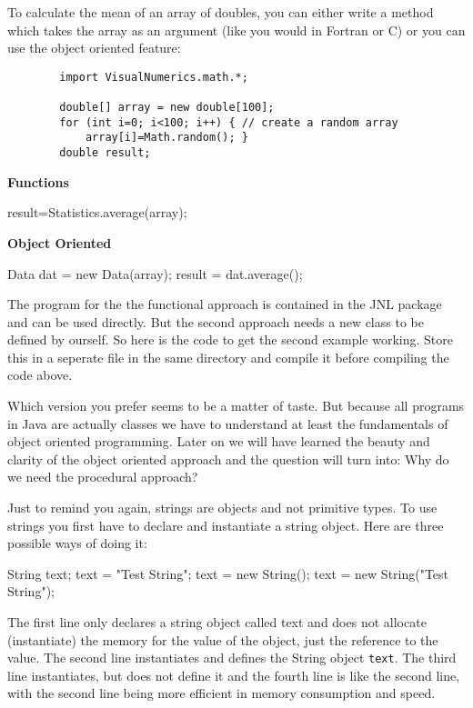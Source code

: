 To calculate the mean of an array of doubles, you can
either write a method which takes the array as an argument (like you would
in Fortran or C) or you can use the object
oriented feature:
\begin{small}
\begin{verbatim}
        import VisualNumerics.math.*;

        double[] array = new double[100]; 
        for (int i=0; i<100; i++) { // create a random array
            array[i]=Math.random(); }
        double result;
\end{verbatim}

\noindent \begin{minipage}{.53\textwidth}
\textbf{Functions}
\begin{sverbatim}
  
 result=Statistics.average(array); 
\end{sverbatim}
\end{minipage}
\begin{minipage}{.41\textwidth}
\textbf{Object Oriented}
\begin{sverbatim}
 Data dat = new Data(array); 
 result = dat.average();
\end{sverbatim}
\end{minipage}
\end{small}
\vspace{.2cm}

The program for the the functional approach is contained in the JNL
package and can be used directly. But the second approach needs a 
new class to be defined by ourself. So here is the code to get the 
second example working. Store this in a seperate file in the same 
directory and compile it before compiling the code above.


Which version you prefer seems to be a matter of taste. 
But because all programs in Java are
actually classes we have to understand at least the 
fundamentals of object oriented programming. 
Later on we will have learned the beauty and clarity of the object
oriented approach and the question will turn into: Why do we need
the procedural approach?

Just to remind you again, strings are objects and not primitive 
types. To use strings you first have to declare and instantiate a string
object. Here are three possible ways of doing it:
\begin{sverbatim}
        String text;
        text = "Test String";
        text = new String();
        text = new String("Test String");
\end{sverbatim}
The first line only declares a string object called text and does not
allocate (instantiate) the memory for the value of the object, just
the reference to the value. The second line instantiates and 
defines the String object \verb|text|. The third line instantiates, but
does not define it and the fourth line is like the second line, with
the second line being more efficient in memory consumption and
speed.


